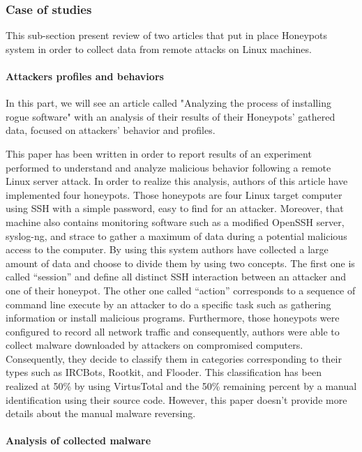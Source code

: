 \subsubsection{Case of studies} %

This sub-section present review of two articles that put in place Honeypots system in order
to collect data from remote attacks on Linux machines. 

\paragraph{Attackers profiles and behaviors} %

In this part, we will see an article called "Analyzing the process of installing
rogue software" \cite{paperAnalyzingProcess} with an analysis of their results of their Honeypots’ gathered data,
focused on attackers’ behavior and profiles.

This paper has been written in order to report results of an experiment performed to
understand and analyze malicious behavior following a remote Linux server attack. In order 
to realize this analysis, authors of this article have implemented four honeypots.
Those honeypots are four Linux target computer using SSH with a simple password, easy to 
find for an attacker. Moreover, that machine also contains monitoring software such as a
modified OpenSSH server, syslog-ng, and strace to gather a maximum of data during a 
potential malicious access to the computer.
By using this system authors have collected a large amount of data and choose to divide
them by using two concepts. The first one is called “session” and define all distinct SSH
interaction between an attacker and one of their honeypot. The other one called “action”
corresponds to a sequence of command line execute by an attacker to do a specific task such
as gathering information or install malicious programs. Furthermore, those honeypots were
configured to record all network traffic and consequently, authors were able to collect
malware downloaded by attackers on compromised computers. Consequently, they decide to
classify them in categories corresponding to their types such as IRCBots, Rootkit, and
Flooder. This classification has been realized at 50\% by using VirtusTotal \cite{vt} and the 50\%
remaining percent by a manual identification using their source code. However, this paper
doesn’t provide more details about the manual malware reversing.

\paragraph{Analysis of collected malware} %

